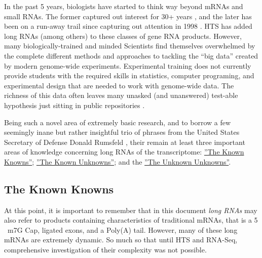     In the past 5 years, biologists have started to think way beyond mRNAs and small RNAs. The former captured out interest for 30+ years \citep{Furuichi1975,Wei1975}, and the later has been on a run-away trail since capturing out attention in 1998 \citep{Fire1998}. HTS has added long RNAs (among others) to these classes of gene RNA products. However, many biologically-trained and minded Scientists find themselves overwhelmed by the complete different methods and approaches to tackling the ``big data'' created by modern genome-wide experiments. Experimental training does not currently provide students with the required skills in statistics, computer programing, and experimental design that are needed to work with genome-wide data. The richness of this data often leaves many unasked (and unanswered) test-able hypothesis just sitting in public repositories \citep{Plocik2013}.

    Being such a novel area of extremely basic research, and to borrow a few seemingly inane but rather insightful trio of phrases from the United States Secretary of Defense Donald Rumsfeld \citep{Rumsfeld2011}, their remain at least three important areas of knowledge concerning long RNAs of the transcriptome: 
    \hyperref[subsec: The Known Knowns]{''The Known Knowns''}; 
    \hyperref[subsec: The Known Unknowns]{''The Known Unknowns''}; 
    and the \hyperref[subsec: The Unknown Unknowns]{''The Unknown Unknowns''}.

  \subsection{The Known Knowns}\label{subsec: The Known Knowns}

    At this point, it is important to remember that in this document   \textit{long RNAs} may also refer to products containing characteristics of traditional mRNAs, that is a 5  \textprime~m7G Cap, ligated exons, and a Poly(A) tail. However, many of these long mRNAs are extremely dynamic. So much so that until HTS and RNA-Seq, comprehensive investigation of their complexity was not possible.


